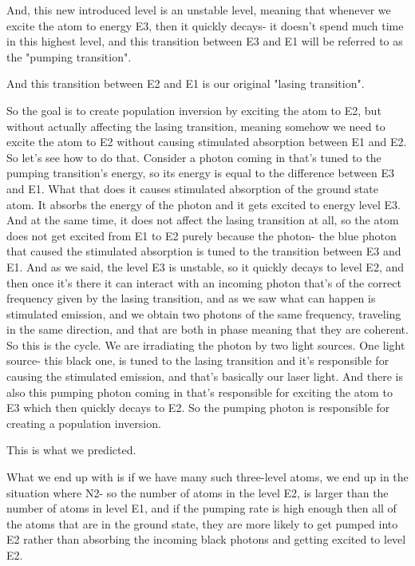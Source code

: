 And, this new introduced level is an unstable level, meaning that whenever we excite the atom to energy E3, then it quickly decays- it doesn't spend much time in this highest level, and this transition between E3 and E1 will be referred to as the "pumping transition".

And this transition between E2 and E1 is our original "lasing transition".

So the goal is to create population inversion by exciting the atom to E2, but without actually affecting the lasing transition, meaning somehow we need to excite the atom to E2 without causing stimulated absorption between E1 and E2. So let's see how to do that. Consider a photon coming in that's tuned to the pumping transition's energy, so its energy is equal to the difference between E3 and E1. What that does it causes stimulated absorption of the ground state atom. It absorbs the energy of the photon and it gets excited to energy level E3. And at the same time, it does not affect the lasing transition at all, so the atom does not get excited from E1 to E2 purely because the photon- the blue photon that caused the stimulated absorption is tuned to the transition between E3 and E1. And as we said, the level E3 is unstable, so it quickly decays to level E2, and then once it's there it can interact with an incoming photon that's of the correct frequency given by the lasing transition, and as we saw what can happen is stimulated emission, and we obtain two photons of the same frequency, traveling in the same direction, and that are both in phase meaning that they are coherent. So this is the cycle. We are irradiating the photon by two light sources. One light source- this black one, is tuned to the lasing transition and it's responsible for causing the stimulated emission, and that's basically our laser light. And there is also this pumping photon coming in that's responsible for exciting the atom to E3 which then quickly decays to E2. So the pumping photon is responsible for creating a population inversion.


This is what we predicted. 

What we end up with is if we have many such three-level atoms, we end up in the situation where N2- so the number of atoms in the level E2, is larger than the number of atoms in level E1, and if the pumping rate is high enough then all of the atoms that are in the ground state, they are more likely to get pumped into E2 rather than absorbing the incoming black photons and getting excited to level E2.

